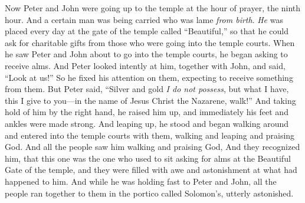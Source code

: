 \begin{biblechapter} %
 Now Peter and John were going up to the temple at the hour of prayer, the ninth hour.
\verse And a certain man was being carried who was lame \textit{from birth}. \textit{He} was placed every day at the gate of the temple called “Beautiful,” so that he could ask for charitable gifts from those who were going into the temple courts.
\verse When he saw Peter and John about to go into the temple courts, he began asking to receive alms.
\verse And Peter looked intently at him, together with John, and said, “Look at us!”
\verse So he fixed his attention on them, expecting to receive something from them.
\verse But Peter said, “Silver and gold \textit{I do not possess}, but what I have, this I give to you—in the name of Jesus Christ the Nazarene, walk!”
\verse And taking hold of him by the right hand, he raised him up, and immediately his feet and ankles were made strong.
\verse And leaping up, he stood and began walking around and entered into the temple courts with them, walking and leaping and praising God.
\verse And all the people saw him walking and praising God,
\verse And they recognized him, that this one was the one who used to sit asking for alms at the Beautiful Gate of the temple, and they were filled with awe and astonishment at what had happened to him.
 And while he was holding fast to Peter and John, all the people ran together to them in the portico called Solomon’s, utterly astonished.

\end{biblechapter}
